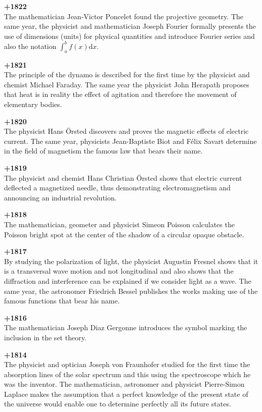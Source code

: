 \textbf{+1822}\\
The mathematician Jean-Victor Poncelet found the projective geometry. The same year, the physicist and mathematician Joseph Fourier formally presents the use of dimensions (units) for physical quantities and introduce Fourier series and also the notation $\int_a^bf(x)\mathrm{d}x$.

\textbf{+1821}\\
The principle of the dynamo is described for the first time by the physicist and chemist Michael Faraday. The same year the physicist John Herapath proposes that heat is in reality the effect of agitation and therefore the movement of elementary bodies.

\textbf{+1820}\\
The physicist Hans Örsted discovers and proves the magnetic effects of electric current. The same year, physicists Jean-Baptiste Biot and Félix Savart determine in the field of magnetism the famous law that bears their name.

\textbf{+1819}\\
The physicist and chemist Hans Christian Örsted shows that electric current deflected a magnetized needle, thus demonstrating electromagnetism and announcing an industrial revolution.

\textbf{+1818}\\
The mathematician, geometer and physicist Simeon Poisson calculates the Poisson bright spot at the center of the shadow of a circular opaque obstacle.

\textbf{+1817}\\
By studying the polarization of light, the physicist Augustin Fresnel shows that it is a transversal wave motion and not longitudinal and also shows that the diffraction and interference can be explained if we consider light as a wave. The same year, the astronomer Friedrich Bessel publishes the works making use of the famous functions that bear his name.

\textbf{+1816}\\
The mathematician Joseph Diaz Gergonne introduces the symbol marking the inclusion in the set theory.

\textbf{+1814}\\
The physicist and optician Joseph von Fraunhofer studied for the first time the absorption lines of the solar spectrum and this using the spectroscope which he was the inventor. The mathematician, astronomer and physicist Pierre-Simon Laplace makes the assumption that a perfect knowledge of the present state of the universe would enable one to determine perfectly all its future states.

